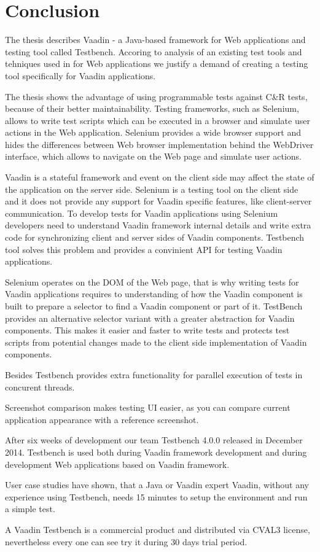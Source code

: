 \chapter {Conclusion}
\label{ch:conclusion}
 The thesis describes Vaadin - a Java-based framework for Web applications and
testing tool called Testbench.
 Accoring to analysis of an existing test tools and tehniques used in for Web
applications we justify a demand of creating a testing tool specifically
for Vaadin applications. 

The thesis shows the advantage of using programmable tests against C\&R tests,
because of their better maintainability. Testing frameworks, such as Selenium,
allows to write test scripts which can be executed in a browser and simulate
user actions in the Web application. Selenium provides a wide browser support
and hides the differences between Web browser implementation behind the
WebDriver interface, which allows to navigate on the Web page and simulate user
actions.

Vaadin is a stateful framework and event on the client side may affect the state
of the application on the server side. Selenium is a testing tool on the client
side and it does not provide any support for Vaadin specific features, like
client-server communication. To develop tests for Vaadin applications using
Selenium developers need to understand Vaadin framework internal details and 
write extra code for synchronizing client and server sides of Vaadin components.
Testbench tool solves this problem and provides a convinient API for testing Vaadin applications.

Selenium operates on the DOM of the Web page, that is why writing tests for
Vaadin applications requires to understanding of how the Vaadin component is
built to prepare a selector to find a Vaadin component or part of it. TestBench
provides an alternative selector variant with a greater abstraction for Vaadin components.
This makes it easier and faster to write tests and protects test scripts from potential
changes made to the client side implementation of Vaadin components.

Besides Testbench provides extra functionality for parallel execution of
tests in concurent threads. 

Screenshot comparison makes testing UI easier,
as you can compare current application appearance with a reference screenshot.

After six weeks of development our team Testbench 4.0.0 released in December
2014. Testbench is used both during Vaadin framework development and during
development Web applications based on Vaadin framework.

 User case studies have shown, that a Java or Vaadin expert Vaadin,
 without any experience using Testbench, needs 15 minutes to setup the
 environment and run a simple test.
 
 A Vaadin Testbench is a commercial product and distributed via CVAL3 license,
 nevertheless every one can see try it during 30 days trial period.